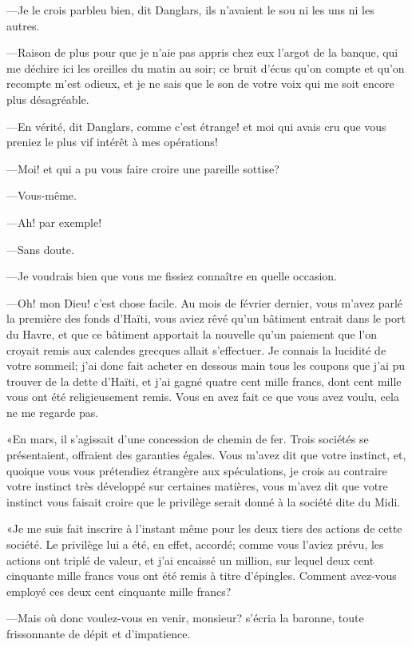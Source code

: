 —Je le crois parbleu bien, dit Danglars, ils n'avaient le sou ni les uns ni les autres. 

—Raison de plus pour que je n'aie pas appris chez eux l'argot de la banque, qui me déchire ici les oreilles du matin au soir; ce bruit d'écus qu'on compte et qu'on recompte m'est odieux, et je ne sais que le son de votre voix qui me soit encore plus désagréable. 

—En vérité, dit Danglars, comme c'est étrange! et moi qui avais cru que vous preniez le plus vif intérêt à mes opérations! 

—Moi! et qui a pu vous faire croire une pareille sottise? 

—Vous-même. 

—Ah! par exemple! 

—Sans doute. 

—Je voudrais bien que vous me fissiez connaître en quelle occasion. 

—Oh! mon Dieu! c'est chose facile. Au mois de février dernier, vous m'avez parlé la première des fonds d'Haïti, vous aviez rêvé qu'un bâtiment entrait dans le port du Havre, et que ce bâtiment apportait la nouvelle qu'un paiement que l'on croyait remis aux calendes grecques allait s'effectuer. Je connais la lucidité de votre sommeil; j'ai donc fait acheter en dessous main tous les coupons que j'ai pu trouver de la dette d'Haïti, et j'ai gagné quatre cent mille francs, dont cent mille vous ont été religieusement remis. Vous en avez fait ce que vous avez voulu, cela ne me regarde pas. 

«En mars, il s'agissait d'une concession de chemin de fer. Trois sociétés se présentaient, offraient des garanties égales. Vous m'avez dit que votre instinct, et, quoique vous vous prétendiez étrangère aux spéculations, je crois au contraire votre instinct très développé sur certaines matières, vous m'avez dit que votre instinct vous faisait croire que le privilège serait donné à la société dite du Midi. 

«Je me suis fait inscrire à l'instant même pour les deux tiers des actions de cette société. Le privilège lui a été, en effet, accordé; comme vous l'aviez prévu, les actions ont triplé de valeur, et j'ai encaissé un million, sur lequel deux cent cinquante mille francs vous ont été remis à titre d'épingles. Comment avez-vous employé ces deux cent cinquante mille francs? 

—Mais où donc voulez-vous en venir, monsieur? s'écria la baronne, toute frissonnante de dépit et d'impatience. 

